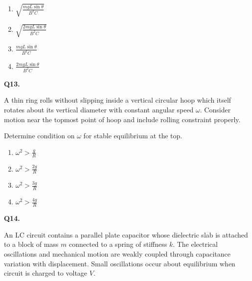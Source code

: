 \documentclass[12pt]{article}
\begin{document}
\begin{enumerate}
\item[(A)] $\sqrt{\frac{mgL\sin\theta}{B^2C}}$
\item[(B)] $\sqrt{\frac{2mgL\sin\theta}{B^2C}}$
\item[(C)] $\frac{mgL\sin\theta}{B^2C}$
\item[(D)] $\frac{2mgL\sin\theta}{B^2C}$
\end{enumerate}


\textbf{Q13.}

A thin ring rolls without slipping inside a vertical circular hoop which itself rotates about its vertical diameter with constant angular speed $\omega$. Consider motion near the topmost point of hoop and include rolling constraint properly.

Determine condition on $\omega$ for stable equilibrium at the top.

\begin{center}
\end{center}

\begin{enumerate}
\item[(A)] $\omega^2>\frac{g}{R}$
\item[(B)] $\omega^2>\frac{2g}{R}$
\item[(C)] $\omega^2>\frac{3g}{R}$
\item[(D)] $\omega^2>\frac{4g}{R}$
\end{enumerate}


\textbf{Q14.}

An LC circuit contains a parallel plate capacitor whose dielectric slab is attached to a block of mass $m$ connected to a spring of stiffness $k$. The electrical oscillations and mechanical motion are weakly coupled through capacitance variation with displacement. Small oscillations occur about equilibrium when circuit is charged to voltage $V$.
\end{document}
